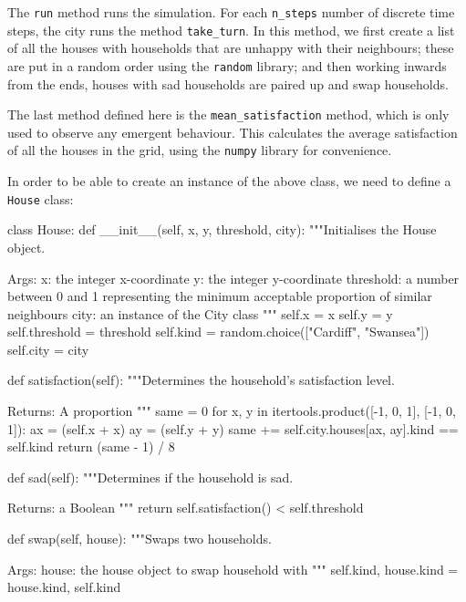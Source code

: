 The \texttt{run} method runs the simulation. For each
\texttt{n_steps} number of discrete time steps, the city runs the
method \texttt{take_turn}.
In this method, we first create a list of all the houses with households that
are unhappy with their neighbours; these are put in a random order using the
\texttt{random} library; and then working inwards from the ends,
houses with sad households are paired up and swap households.

The last method defined here is the \texttt{mean_satisfaction}
method, which is only used to observe any emergent behaviour.
This calculates the average satisfaction of all the houses in the grid, using
the \texttt{numpy} library for convenience.

In order to be able to create an instance of the above class, we need to define
a \texttt{House} class:

\begin{pyin}
class House:
    def __init__(self, x, y, threshold, city):
        """Initialises the House object.

        Args:
            x: the integer x-coordinate
            y: the integer y-coordinate
            threshold: a number between 0 and 1 representing
              the minimum acceptable proportion of similar
              neighbours
            city: an instance of the City class
        """
        self.x = x
        self.y = y
        self.threshold = threshold
        self.kind = random.choice(["Cardiff", "Swansea"])
        self.city = city

    def satisfaction(self):
        """Determines the household's satisfaction level.

        Returns:
            A proportion
        """
        same = 0
        for x, y in itertools.product([-1, 0, 1], [-1, 0, 1]):
            ax = (self.x + x) %
            ay = (self.y + y) %
            same += self.city.houses[ax, ay].kind == self.kind
        return (same - 1) / 8

    def sad(self):
        """Determines if the household is sad.

        Returns:
            a Boolean
        """
        return self.satisfaction() < self.threshold

    def swap(self, house):
        """Swaps two households.

        Args:
            house: the house object to swap household with
        """
        self.kind, house.kind = house.kind, self.kind
\end{pyin}

